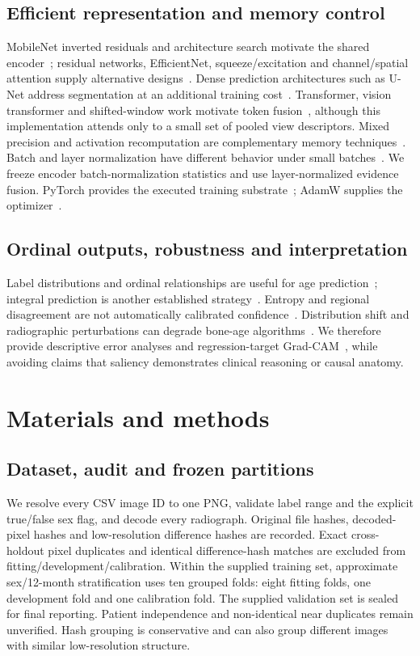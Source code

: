 \documentclass[nolineno]{ieeeaccess}
\begin{document}
\subsection{Efficient representation and memory control}
MobileNet inverted residuals and architecture search motivate the shared encoder~\cite{mobilenetv2,mobilenetv3}; residual networks, EfficientNet, squeeze/excitation and channel/spatial attention supply alternative designs~\cite{resnet,efficientnet,squeeze,cbam}. Dense prediction architectures such as U-Net address segmentation at an additional training cost~\cite{unet}. Transformer, vision transformer and shifted-window work motivate token fusion~\cite{transformer,vit,swin}, although this implementation attends only to a small set of pooled view descriptors.
Mixed precision and activation recomputation are complementary memory techniques~\cite{mixed,checkpoint}. Batch and layer normalization have different behavior under small batches~\cite{batchnorm,layernorm}. We freeze encoder batch-normalization statistics and use layer-normalized evidence fusion. PyTorch provides the executed training substrate~\cite{pytorch}; AdamW supplies the optimizer~\cite{adamw}.

\subsection{Ordinal outputs, robustness and interpretation}
Label distributions and ordinal relationships are useful for age prediction~\cite{chen,coral}; integral prediction is another established strategy~\cite{integral}. Entropy and regional disagreement are not automatically calibrated confidence~\cite{calibration,uncertainty}. Distribution shift and radiographic perturbations can degrade bone-age algorithms~\cite{stress,bias}. We therefore provide descriptive error analyses and regression-target Grad-CAM~\cite{gradcam}, while avoiding claims that saliency demonstrates clinical reasoning or causal anatomy.

\section{Materials and methods}
\subsection{Dataset, audit and frozen partitions}
We resolve every CSV image ID to one PNG, validate label range and the explicit true/false sex flag, and decode every radiograph. Original file hashes, decoded-pixel hashes and low-resolution difference hashes are recorded. Exact cross-holdout pixel duplicates and identical difference-hash matches are excluded from fitting/development/calibration. Within the supplied training set, approximate sex/12-month stratification uses ten grouped folds: eight fitting folds, one development fold and one calibration fold. The supplied validation set is sealed for final reporting. Patient independence and non-identical near duplicates remain unverified. Hash grouping is conservative and can also group different images with similar low-resolution structure.
\end{document}
